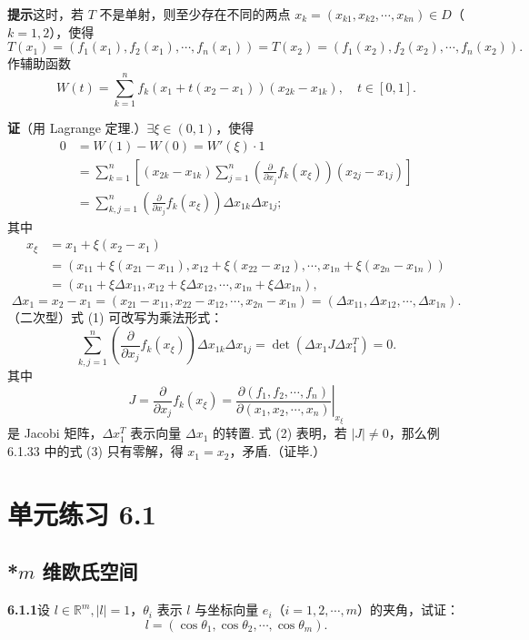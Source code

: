 \documentclass[UTF8, 12pt, fontset=fandol, oneside]{ctexart}
\begin{document}
\noindent\textbf{提示}\quad 这时，若 $T$ 不是单射，则至少存在不同的两点 $x_k=(x_{k1},x_{k2},\cdots,x_{kn})\in D$（$k=1,2$），使得
\[
  T(x_1)=(f_1(x_1),f_2(x_1),\cdots,f_n(x_1))
  =T(x_2)=(f_1(x_2),f_2(x_2),\cdots,f_n(x_2)).
\]
作辅助函数
\[
  W(t)=\sum_{k=1}^n f_k(x_1+t(x_2-x_1))(x_{2k}-x_{1k}),\quad t\in[0,1].
\]

\noindent\textbf{证}\quad （用 Lagrange 定理.）$\exists\xi\in(0,1)$，使得
\[
\begin{aligned}
0&=W(1)-W(0)=W'(\xi)\cdot1\\
&=\sum_{k=1}^n\left[(x_{2k}-x_{1k})\sum_{j=1}^n
\left(\frac{\partial}{\partial x_j}f_k(x_\xi)\right)(x_{2j}-x_{1j})\right]\\
&=\sum_{k,j=1}^n\left(\frac{\partial}{\partial x_j}f_k(x_\xi)\right)\Delta x_{1k}\Delta x_{1j};
\end{aligned}
\tag{1}
\]
其中
\[
\begin{aligned}
x_\xi&=x_1+\xi(x_2-x_1)\\
&=(x_{11}+\xi(x_{21}-x_{11}),x_{12}+\xi(x_{22}-x_{12}),\cdots,x_{1n}+\xi(x_{2n}-x_{1n}))\\
&=(x_{11}+\xi\Delta x_{11},x_{12}+\xi\Delta x_{12},\cdots,x_{1n}+\xi\Delta x_{1n}),
\end{aligned}
\]
\[
  \Delta x_1=x_2-x_1=(x_{21}-x_{11},x_{22}-x_{12},\cdots,x_{2n}-x_{1n})
  =(\Delta x_{11},\Delta x_{12},\cdots,\Delta x_{1n}).
\]
（二次型）式 (1) 可改写为乘法形式：
\[
  \sum_{k,j=1}^n
  \left(\frac{\partial}{\partial x_j}f_k(x_\xi)\right)\Delta x_{1k}\Delta x_{1j}
  =\det(\Delta x_1J\Delta x_1^T)=0. \tag{2}
\]
其中
\[
  J=\frac{\partial}{\partial x_j}f_k(x_\xi)
  =
  \left.\frac{\partial(f_1,f_2,\cdots,f_n)}{\partial(x_1,x_2,\cdots,x_n)}\right|_{x_\xi}
\]
是 Jacobi 矩阵，$\Delta x_1^T$ 表示向量 $\Delta x_1$ 的转置. 式 (2) 表明，若 $|J|\ne0$，那么例 6.1.33 中的式 (3) 只有零解，得 $x_1=x_2$，矛盾.（证毕.）

\section*{单元练习 6.1}

\subsection*{*$m$ 维欧氏空间}

\noindent\textbf{6.1.1}\quad 设 $l\in\mathbb{R}^m,|l|=1$，$\theta_i$ 表示 $l$ 与坐标向量 $e_i$（$i=1,2,\cdots,m$）的夹角，试证：
\[
  l=(\cos\theta_1,\cos\theta_2,\cdots,\cos\theta_m).
\]
\end{document}
